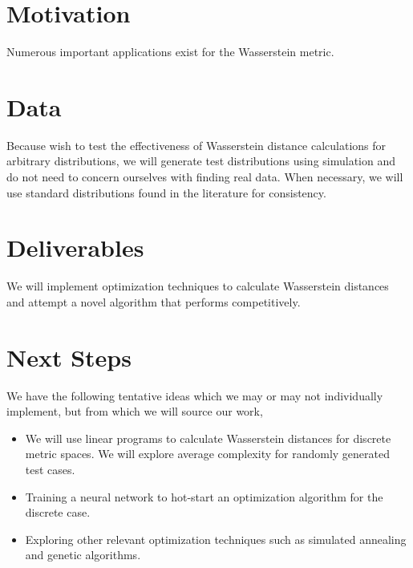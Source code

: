 \documentclass[a4paper]{amsart}
\begin{document}
\section{Motivation}

Numerous important applications exist for the Wasserstein metric. 

\section{Data}

Because wish to test the effectiveness of Wasserstein distance calculations for
arbitrary distributions, we will generate test distributions using simulation
and do not need to concern ourselves with finding real data. When necessary, we
will use standard distributions found in the literature for consistency.

\section{Deliverables}

We will implement optimization techniques to calculate Wasserstein distances and
attempt a novel algorithm that performs competitively.

\section{Next Steps}


We have the following tentative ideas which we may or may not individually
implement, but from which we will source our  work,

\begin{itemize}

\item We will use linear programs to calculate Wasserstein distances for
discrete metric spaces. We will explore average complexity for randomly
generated test cases.

\item Training a neural network to hot-start an optimization algorithm for the
discrete case.

\item Exploring other relevant optimization techniques such as simulated
annealing and genetic algorithms.

\end{itemize}

\end{document}
